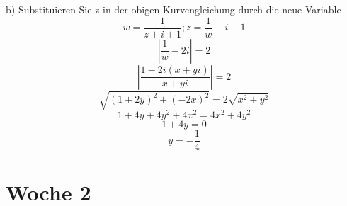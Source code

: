 \documentclass{article}
\begin{document}
    b)  Substituieren Sie z in der obigen Kurvengleichung durch die neue Variable
    \begin{equation*}
        w=\frac{1}{z+i+1}; z=\frac{1}{w}-i-1
    \end{equation*}
    \begin{equation*}
        |\frac{1}{w}-2i|=2
    \end{equation*}
    \begin{equation*}
        |\frac{1-2i(x+yi)}{x+yi}|=2
    \end{equation*}
     \begin{equation*}
        \sqrt{\left(1+2y\right)^2+{\left(-2x\right)^2}} =2\sqrt{x^2+y^2}
     \end{equation*}
     \begin{equation*}
        1+4y+4y^2+4x^2=4x^2+4y^2
     \end{equation*}
     \begin{equation*}
        1+4y=0
     \end{equation*}
     \begin{equation*}
        y=-\frac{1}{4}
     \end{equation*}

     \section*{Woche 2}
\end{document}
